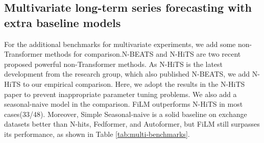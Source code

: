 \documentclass{article}
\begin{document}
\subsection{Multivariate long-term series forecasting with extra baseline models}
For the additional benchmarks for multivariate experiments, we add some non-Transformer methods for comparison.N-BEATS\cite{nbeats} and N-HiTS\cite{challu2022n} are two recent proposed powerful non-Transformer methods. As N-HiTS is the latest development from the research group, which also published N-BEATS, we add N-HiTS to our empirical comparison. Here, we adopt the results in the N-HiTS paper to prevent inappropriate parameter tuning problems. We also add a seasonal-naive model in the comparison. FiLM outperforms N-HiTS in most cases(33/48). Moreover, Simple Seasonal-naive\cite{seasonal-naive} is a solid baseline on exchange datasets better than N-hits, Fedformer, and Autoformer, but FiLM still surpasses its performance, as shown in Table \ref{tab:multi-benchmarks}.
\end{document}
